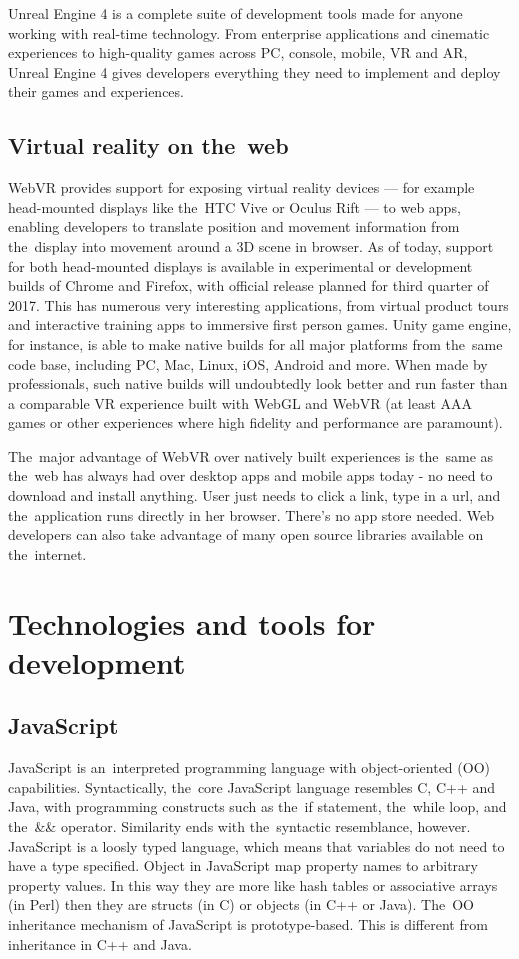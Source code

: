Unreal Engine 4 is a complete suite of development tools made for anyone working with real-time technology. From enterprise applications and cinematic experiences to high-quality games across PC, console, mobile, VR and AR, Unreal Engine 4 gives developers everything they need to implement and deploy their games and experiences. \cite{unrealengine}

\subsection{Virtual reality on the~web}
WebVR provides support for exposing virtual reality devices — for example head-mounted displays like the~HTC Vive or Oculus Rift — to web apps, enabling developers to translate position and movement information from the~display into movement around a 3D scene in browser. As of today, support for both head-mounted displays is available in experimental or development builds of Chrome and Firefox, with official release planned for third quarter of 2017. This has numerous very interesting applications, from virtual product tours and interactive training apps to immersive first person games.
Unity game engine, for instance, is able to make native builds for all major platforms from the~same code base, including PC, Mac, Linux, iOS, Android and more. When made by professionals, such native builds will undoubtedly look better and run faster than a comparable VR experience built with WebGL and WebVR (at least AAA games or other experiences where high fidelity and performance are paramount).

The~major advantage of WebVR over natively built experiences is the~same as the~web has always had over desktop apps and mobile apps today - no need to download and install anything. User just needs to click a link, type in a url, and the~application runs directly in her browser. There’s no app store needed. Web developers can also take advantage of many open source libraries available on the~internet.

\section{Technologies and tools for development}
\subsection{JavaScript}
JavaScript is an~interpreted programming language with object-oriented (OO) capabilities. Syntactically, the~core JavaScript language resembles C, C++ and Java, with programming constructs such as the~if statement, the~while loop, and the~&& operator. Similarity ends with the~syntactic resemblance, however. JavaScript is a loosly typed language, which means that variables do not need to have a type specified. Object in JavaScript map property names to arbitrary property values. In this way they are more like hash tables or associative arrays (in Perl) then they are structs (in C) or objects (in C++ or Java). The~OO inheritance mechanism of JavaScript is prototype-based. This is different from inheritance in C++ and Java. \cite{flanagan}

